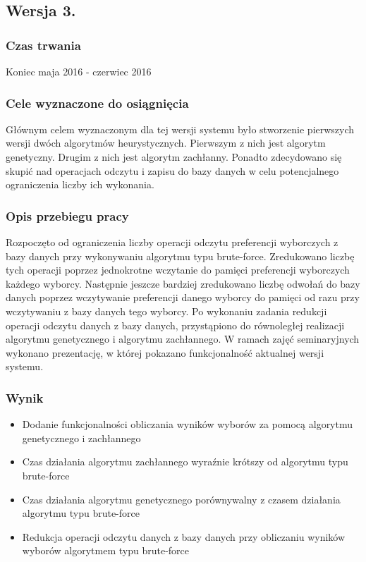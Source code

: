 \documentclass[pdflatex,11pt]{../aghdoc_version2}
\begin{document}
\subsection{Wersja 3.}
\subsubsection{Czas trwania}
Koniec maja 2016 - czerwiec 2016
\subsubsection{Cele wyznaczone do osiągnięcia}
Głównym celem wyznaczonym dla tej wersji systemu było stworzenie pierwszych wersji
dwóch algorytmów heurystycznych. Pierwszym z nich jest algorytm genetyczny. Drugim z
nich jest algorytm zachłanny. Ponadto zdecydowano się skupić nad operacjach odczytu i
zapisu do bazy danych w celu potencjalnego ograniczenia liczby ich wykonania.
\subsubsection{Opis przebiegu pracy}
Rozpoczęto od ograniczenia liczby operacji odczytu preferencji wyborczych z bazy danych
przy wykonywaniu algorytmu typu brute-force. Zredukowano liczbę tych operacji poprzez
jednokrotne wczytanie do pamięci preferencji wyborczych każdego wyborcy. Następnie
jeszcze bardziej zredukowano liczbę odwołań do bazy danych poprzez wczytywanie
preferencji danego wyborcy do pamięci od razu przy wczytywaniu z bazy danych tego
wyborcy. Po wykonaniu zadania redukcji operacji odczytu danych z bazy danych,
przystąpiono do równoległej realizacji algorytmu genetycznego i algorytmu zachłannego. W
ramach zajęć seminaryjnych wykonano prezentację, w której pokazano funkcjonalność
aktualnej wersji systemu.
\subsubsection{Wynik}
\begin{itemize}
\item Dodanie funkcjonalności obliczania wyników wyborów za pomocą algorytmu
genetycznego i zachłannego
\item Czas działania algorytmu zachłannego wyraźnie krótszy od algorytmu typu
brute-force
\item Czas działania algorytmu genetycznego porównywalny z czasem działania algorytmu
typu brute-force
\item Redukcja operacji odczytu danych z bazy danych przy obliczaniu wyników wyborów
algorytmem typu brute-force
\end{itemize}
\end{document}
